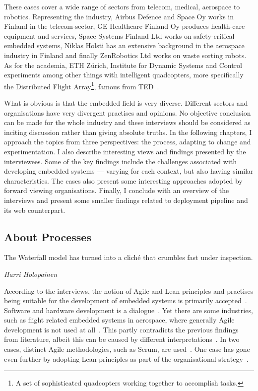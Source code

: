 \documentclass[english]{tktltiki2}
\begin{document}
These cases cover a wide range of sectors from telecom, medical, aerospace to robotics. Representing the industry, Airbus Defence and Space Oy works in Finland in the telecom-sector, GE Healthcare Finland Oy produces health-care equipment and services, Space Systems Finland Ltd works on safety-critical embedded systems, Niklas Holsti has an extensive background in the aerospace industry in Finland and finally ZenRobotics Ltd works on waste sorting robots. As for the academia, ETH Zürich, Institute for Dynamic Systems and Control experiments among other things with intelligent quadcopters, more specifically the Distributed Flight Array\footnote{A set of sophisticated quadcopters working together to accomplish tasks.}, famous from TED~\cite{Dan13}.

What is obvious is that the embedded field is very diverse. Different sectors and organisations have very divergent practises and opinions. No objective conclusion can be made for the whole industry and these interviews should be considered as inciting discussion rather than giving absolute truths. In the following chapters, I approach the topics from three perspectives: the process, adapting to change and experimentation. I also describe interesting views and findings presented by the interviewees. Some of the key findings include the challenges associated with developing embedded systems — varying for each context, but also having similar characteristics. The cases also present some interesting approaches adopted by forward viewing organisations. Finally, I conclude with an overview of the interviews and present some smaller findings related to deployment pipeline and its web counterpart.

\subsection{About Processes}

\epigraph{The Waterfall model has turned into a cliché that crumbles fast under inspection.}{\textit{Harri Holopainen~\cite{Hol15a}}}

According to the interviews, the notion of Agile and Lean principles and practises being suitable for the development of embedded systems is primarily accepted~\cite{BT15, Hol15a, Koi15, Kri15, Pet15}. Software and hardware development is a dialogue~\cite{BT15}. Yet there are some industries, such as flight related embedded systems in aerospace, where generally Agile development is not used at all~\cite{Hol15b}. This partly contradicts the previous findings from literature, albeit this can be caused by different interpretations~\cite{LB03}. In two cases, distinct Agile methodologies, such as Scrum, are used~\cite{BT15, Pet15}. One case has gone even further by adopting Lean principles as part of the organisational strategy~\cite{BT15}.
\end{document}
